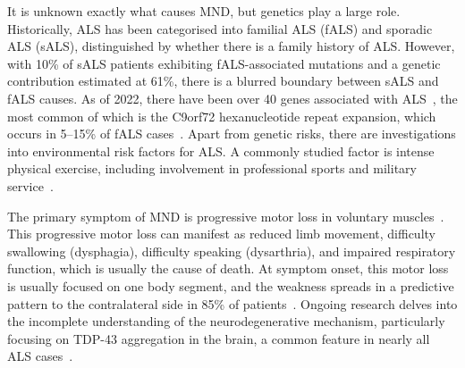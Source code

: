 It is unknown exactly what causes MND, but genetics play a large role.
Historically, ALS has been categorised into familial ALS (fALS) and sporadic ALS (sALS), distinguished by whether there is a family history of ALS.
However, with 10\% of sALS patients exhibiting fALS-associated mutations and a genetic contribution estimated at 61\%, there is a blurred boundary between sALS and fALS causes.
As of 2022, there have been over 40 genes associated with ALS~\cite{goutmanRecentAdvancesDiagnosis2022a}, the most common of which is the C9orf72 hexanucleotide repeat expansion, which occurs in 5--15\% of fALS cases~\cite{vanesAmyotrophicLateralSclerosis2017}.
Apart from genetic risks, there are investigations into environmental risk factors for ALS. A commonly studied factor is intense physical exercise, including involvement in professional sports and military service~\cite{mckayMilitaryServiceRelated2021, lacortePhysicalActivityPhysical2016}.


The primary symptom of MND is progressive motor loss in voluntary muscles~\cite{vanesAmyotrophicLateralSclerosis2017}.
This progressive motor loss can manifest as reduced limb movement, difficulty swallowing (dysphagia), difficulty speaking (dysarthria), and impaired respiratory function, which is usually the cause of death.
At symptom onset, this motor loss is usually focused on one body segment, and the weakness spreads in a predictive pattern to the contralateral side in 85\% of patients~\cite{walhoutPatternsSymptomDevelopment2018}.
Ongoing research delves into the incomplete understanding of the neurodegenerative mechanism, particularly focusing on TDP-43 aggregation in the brain, a common feature in nearly all ALS cases~\cite{blokhuisProteinAggregationAmyotrophic2013}.

